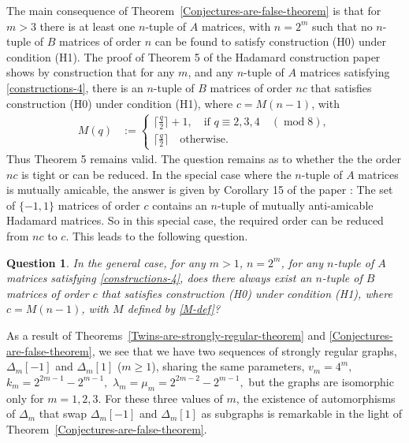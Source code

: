 \documentclass[11pt,a4paper]{jacodesmath}
\newtheorem{question}{Question}
\begin{document}
The main consequence of Theorem~\ref{Conjectures-are-false-theorem} is that for $m>3$ there is at
least one $n$-tuple of $A$ matrices,
with $n=2^m$ such that no $n$-tuple of $B$ matrices of order $n$ can be found to satisfy
construction (H0) under condition (H1).
The proof of Theorem 5 of the Hada\-mard construction paper \cite{Leo14Constructions} shows by
construction that for any $m$,
and any $n$-tuple of $A$ matrices satisfying \eqref{constructions-4}, there is an $n$-tuple of $B$
matrices of order $nc$ that
satisfies construction (H0) under condition (H1), where $c=M(n-1)$, with
\begin{align}
M(q) &:=
\begin{cases}
\lceil \frac{q}{2} \rceil + 1, \quad \text{if~} q \equiv 2,3,4 \quad (\operatorname{mod} 8),
\\
\lceil \frac{q}{2} \rceil \quad \text{otherwise.}
\end{cases}
\label{M-def}
\end{align}
Thus Theorem 5 remains valid.
The question remains as to whether the the order $nc$ is tight or can be reduced.
In the special case where the $n$-tuple of $A$ matrices is mutually amicable, the answer is given by
Corollary 15 of the paper \cite{Leo14Constructions}:
The set of $\{-1,1\}$ matrices of order $c$ contains an $n$-tuple of mutually anti-amicable
Hada\-mard matrices.
So in this special case, the required order can be reduced from $nc$ to $c$.
This leads to the following question.
\begin{question}
In the general case, for any $m>1$, $n=2^m$, for any $n$-tuple of $A$ matrices satisfying
\eqref{constructions-4},
does there always exist an $n$-tuple of $B$ matrices of order $c$ that
satisfies construction (H0) under condition (H1), where $c=M(n-1)$, with $M$ defined by
\eqref{M-def}?
\end{question}

As a result of Theorems~\ref{Twins-are-strongly-regular-theorem} and
\ref{Conjectures-are-false-theorem},
we see that we have two sequences of strongly regular graphs, $\varDelta_m[-1]$ and $\varDelta_m[1]$
($m \geqslant 1$),
sharing the same parameters,
$v_m = 4^m,$ $k_m = 2^{2 m - 1} - 2^{m - 1},$ $\lambda_m=\mu_m=2^{2 m - 2} - 2^{m - 1},$
but the graphs are isomorphic only for $m=1, 2, 3$.
For these three values of $m$, the existence of
automorphisms of $\varDelta_m$ that swap $\varDelta_m[-1]$ and $\varDelta_m[1]$
as subgraphs \cite[Table 1]{Leo14Constructions}
is remarkable in the light of Theorem~\ref{Conjectures-are-false-theorem}.
\end{document}
